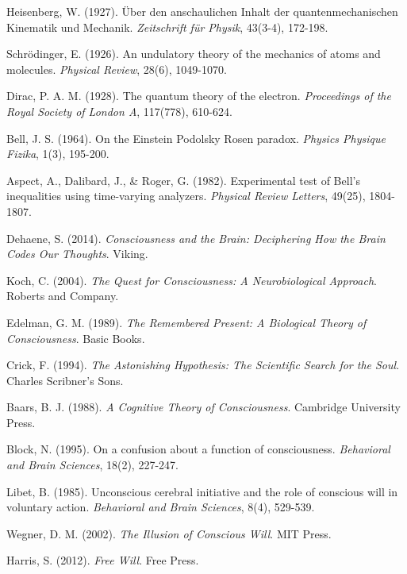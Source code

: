 \documentclass[12pt]{article}
\begin{document}
\begin{thebibliography}{99}
Heisenberg, W. (1927). Über den anschaulichen Inhalt der quantenmechanischen Kinematik und Mechanik. \textit{Zeitschrift für Physik}, 43(3-4), 172-198.

Schrödinger, E. (1926). An undulatory theory of the mechanics of atoms and molecules. \textit{Physical Review}, 28(6), 1049-1070.

Dirac, P. A. M. (1928). The quantum theory of the electron. \textit{Proceedings of the Royal Society of London A}, 117(778), 610-624.

Bell, J. S. (1964). On the Einstein Podolsky Rosen paradox. \textit{Physics Physique Fizika}, 1(3), 195-200.

Aspect, A., Dalibard, J., \& Roger, G. (1982). Experimental test of Bell's inequalities using time-varying analyzers. \textit{Physical Review Letters}, 49(25), 1804-1807.

Dehaene, S. (2014). \textit{Consciousness and the Brain: Deciphering How the Brain Codes Our Thoughts}. Viking.

Koch, C. (2004). \textit{The Quest for Consciousness: A Neurobiological Approach}. Roberts and Company.

Edelman, G. M. (1989). \textit{The Remembered Present: A Biological Theory of Consciousness}. Basic Books.

Crick, F. (1994). \textit{The Astonishing Hypothesis: The Scientific Search for the Soul}. Charles Scribner's Sons.

Baars, B. J. (1988). \textit{A Cognitive Theory of Consciousness}. Cambridge University Press.

Block, N. (1995). On a confusion about a function of consciousness. \textit{Behavioral and Brain Sciences}, 18(2), 227-247.

Libet, B. (1985). Unconscious cerebral initiative and the role of conscious will in voluntary action. \textit{Behavioral and Brain Sciences}, 8(4), 529-539.

Wegner, D. M. (2002). \textit{The Illusion of Conscious Will}. MIT Press.

Harris, S. (2012). \textit{Free Will}. Free Press.


\end{thebibliography}
\end{document}
